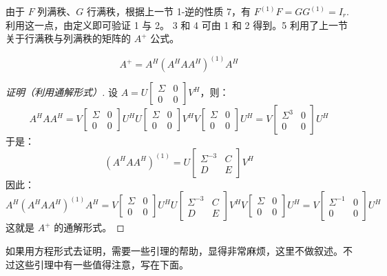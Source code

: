 \begin{remark}
由于 $F$ 列满秩、$G$ 行满秩，根据上一节 1-逆的性质 7，有 $F^{(1)}F=GG^{(1)}=I_r$.  利用这一点，由定义即可验证 1 与 2。
3 和 4 可由 1 和 2 得到。5 利用了上一节关于行满秩与列满秩的矩阵的 $A^+$ 公式。
\end{remark}

\begin{theorem}
\[
    A^+=A^H(A^HAA^H)^{(1)}A^H
\]
\end{theorem}
\begin{proof}[证明（利用通解形式）]
设 $A=U\begin{bmatrix}\Sigma&0\\0&0\end{bmatrix}V^H$，则：
\[
    A^HAA^H=V\begin{bmatrix}\Sigma&0\\0&0\end{bmatrix}U^HU\begin{bmatrix}\Sigma&0\\0&0\end{bmatrix}V^HV\begin{bmatrix}\Sigma&0\\0&0\end{bmatrix}U^H=V\begin{bmatrix}\Sigma^3&0\\0&0\end{bmatrix}U^H
\]
于是：
\[
    (A^HAA^H)^{(1)}=U\begin{bmatrix}\Sigma^{-3}&C\\D&E\end{bmatrix}V^H
\]
因此：
\[
    A^H(A^HAA^H)^{(1)}A^H=V\begin{bmatrix}\Sigma&0\\0&0\end{bmatrix}U^HU\begin{bmatrix}\Sigma^{-3}&C\\D&E\end{bmatrix}V^HV\begin{bmatrix}\Sigma&0\\0&0\end{bmatrix}U^H=V\begin{bmatrix}\Sigma^{-1}&0\\0&0\end{bmatrix}U^H
\]
这就是 $A^+$ 的通解形式。
\end{proof}

如果用方程形式去证明，需要一些引理的帮助，显得非常麻烦，这里不做叙述。不过这些引理中有一些值得注意，写在下面。

